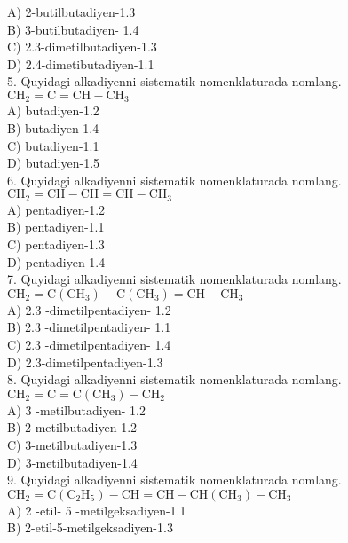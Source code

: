 A) 2-butilbutadiyen-1.3\\
B) 3-butilbutadiyen- 1.4\\
C) 2.3-dimetilbutadiyen-1.3\\
D) 2.4-dimetibutadiyen-1.1\\
5. Quyidagi alkadiyenni sistematik nomenklaturada nomlang.\\
$\mathrm{CH}_{2}=\mathrm{C}=\mathrm{CH}-\mathrm{CH}_{3}$\\
A) butadiyen-1.2\\
B) butadiyen-1.4\\
C) butadiyen-1.1\\
D) butadiyen-1.5\\
6. Quyidagi alkadiyenni sistematik nomenklaturada nomlang.\\
$\mathrm{CH}_{2}=\mathrm{CH}-\mathrm{CH}=\mathrm{CH}-\mathrm{CH}_{3}$\\
A) pentadiyen-1.2\\
B) pentadiyen-1.1\\
C) pentadiyen-1.3\\
D) pentadiyen-1.4\\
7. Quyidagi alkadiyenni sistematik nomenklaturada nomlang.\\
$\mathrm{CH}_{2}=\mathrm{C}\left(\mathrm{CH}_{3}\right)-\mathrm{C}\left(\mathrm{CH}_{3}\right)=\mathrm{CH}-\mathrm{CH}_{3}$\\
A) 2.3 -dimetilpentadiyen- 1.2\\
B) 2.3 -dimetilpentadiyen- 1.1\\
C) 2.3 -dimetilpentadiyen- 1.4\\
D) 2.3-dimetilpentadiyen-1.3\\
8. Quyidagi alkadiyenni sistematik nomenklaturada nomlang.\\
$\mathrm{CH}_{2}=\mathrm{C}=\mathrm{C}\left(\mathrm{CH}_{3}\right)-\mathrm{CH}_{2}$\\
A) 3 -metilbutadiyen- 1.2\\
B) 2-metilbutadiyen-1.2\\
C) 3-metilbutadiyen-1.3\\
D) 3-metilbutadiyen-1.4\\
9. Quyidagi alkadiyenni sistematik nomenklaturada nomlang.\\
$\mathrm{CH}_{2}=\mathrm{C}\left(\mathrm{C}_{2} \mathrm{H}_{5}\right)-\mathrm{CH}=\mathrm{CH}-\mathrm{CH}\left(\mathrm{CH}_{3}\right)-\mathrm{CH}_{3}$\\
A) 2 -etil- 5 -metilgeksadiyen-1.1\\
B) 2-etil-5-metilgeksadiyen-1.3\\
